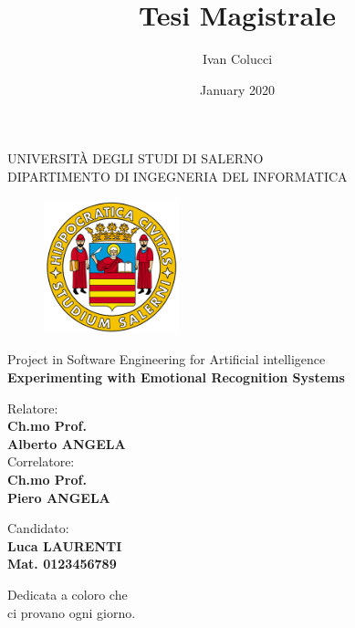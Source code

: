 \documentclass[a4paper, 12pt, oneside]{book}
\title{Tesi Magistrale}
\author{Ivan Colucci}
\date{January 2020}
\newenvironment{dedication}
  {\clearpage           %
   \thispagestyle{empty}%
   \vspace*{\stretch{1}}%
   \itshape             %
   \raggedleft          %
  }
  {\par %
   \vspace{\stretch{3}} %
   \clearpage           %
  }
\begin{document}
\begin{titlepage}
    \begin{center}
        \LARGE{\uppercase{Università degli Studi di Salerno}}\\
        \vspace{5mm}
    	\uppercase{\normalsize Dipartimento di Ingegneria del informatica }\\
    \end{center}
    \begin{figure}[H]
        \centering
        \includegraphics[width=0.35\textwidth]{logo_unisa}
    \end{figure}
    
    \begin{center}
    	\normalsize{Project in Software Engineering for Artificial intelligence}\\
    	\vspace{15mm}
        {\LARGE{\bf Experimenting with Emotional Recognition Systems}}\\
    	\vspace{3mm}
    \end{center}
    
    \vspace{15mm}
    \noindent
    \begin{minipage}[t]{0.47\textwidth}
    	{\large{ Relatore:\\\bf Ch.mo Prof. \\Alberto ANGELA}}
    	\vspace{12mm}\\
    	{\large{ Correlatore:\\ \bf Ch.mo Prof. \\Piero ANGELA}}
    \end{minipage}
    \hfill
    \begin{minipage}[t]{0.4\textwidth}\raggedleft
    	{\large{Candidato: \\ \bf Luca LAURENTI\\ Mat. 0123456789}}
    \end{minipage}
    
    \vspace{20mm}
    

\end{titlepage}
\begin{dedication}
Dedicata a coloro che\\ ci provano ogni giorno.
\end{dedication}
\tableofcontents
\clearpage
\sloppy
{}
\end{document}
